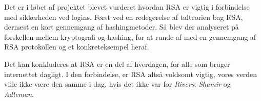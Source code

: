 Det er i løbet af projektet blevet vurderet hvordan RSA er vigtig i forbindelse med sikkerheden ved logins.
Først ved en redegørelse af talteorien bag RSA, dernæst en kort gennemgang af hashingmetoder.
Så blev der analyseret på forskellen mellem kryptografi og hashing, for at runde af med en gennemgang af RSA protokollen og et konkreteksempel heraf.
\par
Det kan konkluderes at RSA er en del af hverdagen, for alle som bruger internettet dagligt.
I den forbindelse, er RSA altså voldsomt vigtig, vores verden ville ikke være den samme i dag, hvis det ikke var for \textit{Rivers}, \textit{Shamir} og \textit{Adleman}.

